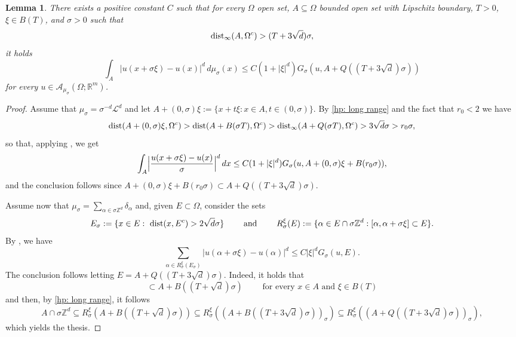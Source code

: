 \documentclass{article}
\theoremstyle{plain}
\newtheorem{lemma}[theorem]{Lemma}
\theoremstyle{definition}
\def\ZZ{{\mathbb Z}}
\def\ms{\mu_\sigma}
\newcommand{\s}{\sigma}
\newcommand{\A}{\mathcal{A}}
\numberwithin{equation}{section}
\begin{document}
\begin{lemma}\label{lemma: controllo long range on frames}
There exists a positive constant $C$ such that for every $\Omega$ open set, $A\subseteq \Omega$ bounded open set with Lipschitz boundary, $T>0$, $\xi \in B(T)$, and $\s>0$ such that 
\begin{equation}\label{hp: long range}
    \text{\rm dist}_\infty(A, \Omega^c)>(T+3\sqrt{d})\s,
\end{equation}
it holds
\begin{equation*}
    \int_{A}|u(x+\s\xi)-u(x)|^d\,d\ms(x)\leq C(1+|\xi|^d)G_\s(u,A+Q((T+3\sqrt{d})\s))
\end{equation*}
for every $u \in \A_{\ms}(\Omega ;\mathbb{R}^{m})$. 
\end{lemma}
\begin{proof}
Assume that $\ms=\s^{-d}\mathcal{L}^d$ and let $A+(0,\s)\xi:=\{x+t\xi: x\in A, t\in(0,\s)\}$. By \eqref{hp: long range} and the fact that $r_0<2$ we have
    \begin{equation*}
        \text{\rm dist}(A+(0,\s)\xi, \Omega^c) > \text{\rm dist}(A+B(\s T), \Omega^c) > \text{\rm dist}_\infty(A+Q(\s T), \Omega^c) >3\sqrt{d}\s>r_0\s,
    \end{equation*}
    so that, applying \cite[Lemma 4.1]{AABPT}, we get
    \begin{equation*}
        \int_{A}\Bigl|\frac{u(x+\s\xi)-u(x)}{\s}\Bigr|^d\,dx\leq C(1+|\xi|^d)G_\s(u,A+(0,\s)\xi+B(r_0\s)),
    \end{equation*}
    and the conclusion follows since $A+(0,\s)\xi+B(r_0\s)\subset A+Q((T+3\sqrt{d})\s)$.
    
    Assume now that $\ms=\sum_{\alpha\in\s\ZZ^d}\delta_\alpha$ and, given $E\subset \Omega$, consider the sets 
\begin{equation*}
    E_{\s}:=\{x\in E: \text{ \rm dist}(x,E^c)>2\sqrt{d}\s\} \qquad \text{ and } \qquad R_\s^\xi(E):=\{\alpha\in E\cap  \s\ZZ^d: [\alpha, \alpha+\s\xi]\subset E\}.
\end{equation*} 
By \cite[Lemma 3.6]{AliCic}, we have 
\begin{equation*}
    \sum_{\alpha\in R_\s^\xi(E_\s)}|u(\alpha+\s\xi)-u(\alpha)|^d \leq C |\xi|^d G_\s(u,E).
\end{equation*}
The conclusion follows letting $E=A+Q((T+3\sqrt{d})\s)$. Indeed, it holds that
\begin{equation*}
    [x,x+\s\xi]\subset A+B((T+\sqrt{d})\s) \qquad \text{ for every } x\in A \text{ and } \xi\in B(T) 
\end{equation*}
and then, by \eqref{hp: long range}, it follows
    \begin{equation*}
        A\cap \s\ZZ^d\subseteq R_\s^\xi(A+B((T+\sqrt{d})\s))\subseteq R_\s^\xi((A+B((T+3\sqrt{d})\s))_\s) \subseteq R_\s^\xi((A+Q((T+3\sqrt{d})\s))_\s), 
    \end{equation*}
    which yields the thesis.
\end{proof}
\end{document}
